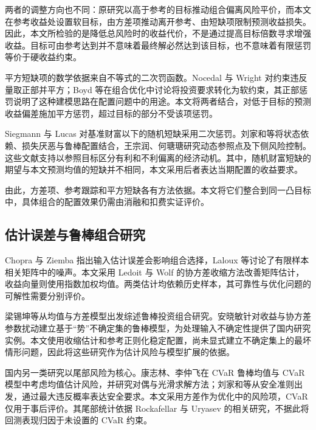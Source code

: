 两者的调整方向也不同：原研究以高于参考的目标推动组合偏离风险平价，而本文在参考收益处设置软目标，由方差项推动离开参考、由短缺项限制预测收益损失。因此，本文所检验的是降低总风险时的收益代价，不是通过提高目标倍数寻求增强收益。目标可由参考达到并不意味着最终解必然达到该目标，也不意味着有限惩罚等价于硬收益约束。

平方短缺项的数学依据来自不等式的二次罚函数。Nocedal 与 Wright 对约束违反量取正部并平方\cite{nocedal2006numerical}；Boyd 等在组合优化中讨论将投资要求转化为软约束，其正部惩罚说明了这种建模思路在配置问题中的用途\cite{boyd2017multiperiod}。本文将两者结合，对低于目标的预测收益偏差施加平方惩罚，超过目标的部分不受该项惩罚。

Siegmann 与 Lucas 对基准财富以下的随机短缺采用二次惩罚\cite{siegmann2005discrete}。刘家和等将状态依赖、损失厌恶与鲁棒配置结合\cite{liu2018lossaverse}，王宗润、何瑭瑭研究动态参照点及下侧风险控制\cite{wang2021reference}。这些文献支持以参照目标区分有利和不利偏离的经济动机。其中，随机财富短缺的期望与本文预测均值的短缺并不相同，本文采用后者表达当期配置的收益要求。

由此，方差项、参考跟踪和平方短缺各有方法依据。本文将它们整合到同一凸目标中，具体组合的配置效果仍需由消融和扣费实证评价。

\subsection{估计误差与鲁棒组合研究}
Chopra 与 Ziemba 指出输入估计误差会影响组合选择\cite{chopra1993effect}，Laloux 等讨论了有限样本相关矩阵中的噪声\cite{laloux1999noise}。本文采用 Ledoit 与 Wolf 的协方差收缩方法改善矩阵估计\cite{ledoit2004well}，收益向量则使用指数加权均值。两类估计均依赖历史样本，其可靠性与优化问题的可解性需要分别评价。

梁锡坤等从均值与方差模型出发综述鲁棒投资组合研究\cite{liang2014robust}。安晓敏针对收益与协方差参数扰动建立基于“势”不确定集的鲁棒模型\cite{an2014robust}，为处理输入不确定性提供了国内研究实例。本文使用收缩估计和参考正则化稳定配置，尚未显式建立不确定集上的最坏情形问题，因此将这些研究作为估计风险与模型扩展的依据。

国内另一类研究以尾部风险为核心。康志林、李仲飞在 CVaR 鲁棒均值与 CVaR 模型中考虑均值估计风险，并研究对偶与光滑求解方法\cite{kang2017cvar}；刘家和等从安全准则出发，通过最大违反概率表达安全要求\cite{liu2016cvar}。本文采用方差作为优化中的风险项，CVaR 仅用于事后评价。其尾部统计依据 Rockafellar 与 Uryasev 的相关研究\cite{rockafellar2000optimization,rockafellar2002conditional}，不据此将回测表现归因于未设置的 CVaR 约束。


